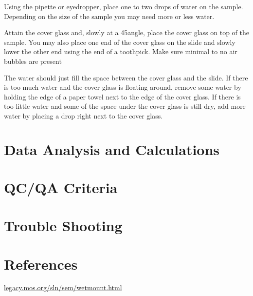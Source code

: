 \documentclass[12pt]{../SOP3_beta}
\begin{document}
\NP Using the pipette or eyedropper, place one to two drops of water on the sample. Depending on the size of the sample you may need more or less water. 

\NP Attain the cover glass and, slowly at a 45\degree angle, place the cover glass on top of the sample. You may also place one end of the cover glass on the slide and slowly lower the other end using the end of a toothpick. Make sure minimal to no air bubbles are present

\NP The water should just fill the space between the cover glass and the slide. If there is too much water and the cover glass is floating around, remove some water by holding the edge of a paper towel next to the edge of the cover glass. If there is too little water and some of the space under the cover glass is still dry, add more water by placing a drop right next to the cover glass.


\section{Data Analysis and Calculations}

\section{QC/QA Criteria}

\section{Trouble Shooting}

\section{References}

\NP \href{http://legacy.mos.org/sln/sem/wetmount.html}{legacy.mos.org/sln/sem/wetmount.html}
\end{document}

